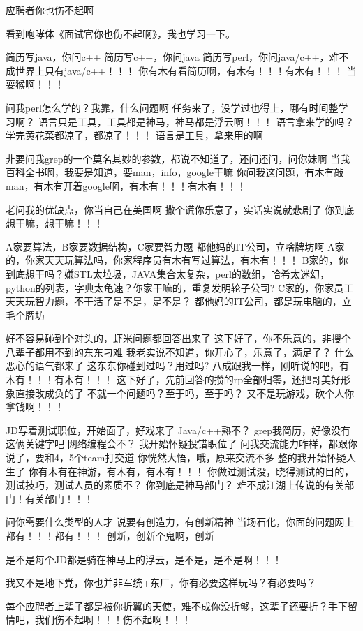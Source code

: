 应聘者你也伤不起啊

看到咆哮体《面试官你也伤不起啊》，我也学习一下。


简历写java，你问c++
简历写c++，你问java
简历写perl，你问java/c++，难不成世界上只有java/c++！！！
你有木有看简历啊，有木有！！！有木有！！！
当耍猴啊！！！

问我perl怎么学的？我靠，什么问题啊
任务来了，没学过也得上，哪有时间整学习啊？
语言只是工具，工具都是神马，神马都是浮云啊！！！
语言拿来学的吗？学完黄花菜都凉了，都凉了！！！
语言是工具，拿来用的啊

非要问我grep的一个莫名其妙的参数，都说不知道了，还问还问，问你妹啊
当我百科全书啊，我要是知道，要man，info，google干嘛
你问我这问题，有木有敲man，有木有开着google啊，有木有！！！有木有！！！

老问我的优缺点，你当自己在美国啊
撒个谎你乐意了，实话实说就悲剧了
你到底想干嘛，想干嘛！！！

A家要算法，B家要数据结构，C家要智力题
都他妈的IT公司，立啥牌坊啊
A家的，你家天天玩算法吗，你家程序员有木有写过算法，有木有！！！
B家的，你到底想干吗？嫌STL太垃圾，JAVA集合太复杂，perl的数组，哈希太迷幻，python的列表，字典太龟速？你家干嘛的，重复发明轮子公司?
C家的，你家员工天天玩智力题，不干活了是不是，是不是？
都他妈的IT公司，都是玩电脑的，立毛个牌坊

好不容易碰到个对头的，虾米问题都回答出来了
这下好了，你不乐意的，非搜个八辈子都用不到的东东刁难
我老实说不知道，你开心了，乐意了，满足了？ 什么恶心的语气都来了
这东东你碰到过吗？用过吗? 八成跟我一样，刚听说的吧，有木有！！！有木有！！！
这下好了，先前回答的攒的rp全部归零，还把哥美好形象直接改成负的了
不就一个问题吗？至于吗，至于吗？
又不是玩游戏，砍个人你拿钱啊！！！

JD写着测试职位，开始面了，好戏来了
Java/c++熟不？ grep我简历，好像没有这俩关键字吧
网络编程会不？ 我开始怀疑投错职位了
问我交流能力咋样，都跟你说了，要和4，5个team打交道
你恍然大悟，哦，原来交流不多
整的我开始怀疑人生了
你有木有在神游，有木有，有木有！！！
你做过测试没，晓得测试的目的，测试技巧，测试人员的素质不？
你到底是神马部门？ 难不成江湖上传说的有关部门！有关部门！！！

问你需要什么类型的人才
说要有创造力，有创新精神
当场石化，你面的问题网上都有！！！都有！！！
创新，创新个鬼啊，创新

是不是每个JD都是骑在神马上的浮云，是不是，是不是啊！！！

我又不是地下党，你也并非军统+东厂，你有必要这样玩吗？有必要吗？

每个应聘者上辈子都是被你折翼的天使，难不成你没折够，这辈子还要折？手下留情吧，我们伤不起啊！！！伤不起啊！！！
